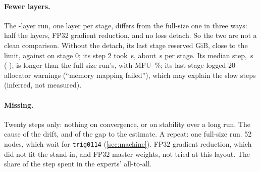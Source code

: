 \paragraph{Fewer layers.} The \TriKtSmallLayers-layer run, one layer per stage, differs from the full-size one in three ways: half the layers, FP32 gradient reduction, and no loss detach. So the two are not a clean comparison. Without the detach, its last stage reserved \TriKtSmallMemLast{} GiB, close to the limit, against \TriKtSmallMemZero{} on stage 0; its step 2 took \TriKtSmallStepTwo\,s, about \TriKtSmallSweep\,s per stage. Its median step, \TriKtSmallStep\,s (\TriKtSmallStepLo-\TriKtSmallStepHi), is longer than the full-size run's, with MFU \TriKtSmallMfu\,\%; its last stage logged 20 allocator warnings (``memory mapping failed''), which may explain the slow steps (inferred, not measured).

\paragraph{Missing.} Twenty steps only: nothing on convergence, or on stability over a long run. The cause of the drift, and of the gap to the estimate. A repeat: one full-size run. 52 nodes, which wait for \texttt{trig0114} (\cref{sec:machine}). FP32 gradient reduction, which did not fit the stand-in, and FP32 master weights, not tried at this layout. The share of the step spent in the experts' all-to-all.

